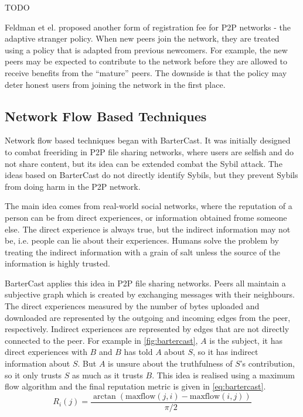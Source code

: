 TODO \cite{resnick2001social}

Feldman et el. proposed another form of registration fee for P2P networks - the
adaptive stranger policy\cite{feldman2004robust}. When new peers join the
network, they are treated using a policy that is adapted from previous
newcomers. For example, the new peers may be expected to contribute to the
network before they are allowed to receive benefits from the ``mature'' peers.
The downside is that the policy may deter honest users from joining the network
in the first place.


\subsection{Network Flow Based Techniques}\label{sec:network-flow}
Network flow based techniques began with
BarterCast\cite{meulpolder2009bartercast}. It was initially designed to combat
freeriding in P2P file sharing networks, where users are selfish and do not
share content, but its idea can be extended combat the Sybil attack. The ideas
based on BarterCast do not directly identify Sybils, but they prevent Sybils
from doing harm in the P2P network.

The main idea comes from real-world social networks, where the reputation of a
person can be from direct experiences, or information obtained frome someone
else. The direct experience is always true, but the indirect information may not
be, i.e. people can lie about their experiences. Humans solve the problem by
treating the indirect information with a grain of salt unless the source of the
information is highly trusted.

BarterCast applies this idea in P2P file sharing networks. Peers all maintain a
subjective graph which is created by exchanging messages with their neighbours.
The direct experiences measured by the number of bytes uploaded and downloaded
are represented by the outgoing and incoming edges from the peer, respectively.
Indirect experiences are represented by edges that are not directly connected to
the peer. For example in \autoref{fig:bartercast}, $A$ is the subject, it has
direct experiences with $B$ and $B$ has told $A$ about $S$, so it has indirect
information about $S$. But $A$ is unsure about the truthfulness of $S$'s
contribution, so it only trusts $S$ as much as it trusts $B$. This idea is
realised using a maximum flow algorithm and the final reputation metric is given
in \autoref{eq:bartercast}.
\begin{equation}\label{eq:bartercast}
  R_i(j) = \frac{\arctan(\text{maxflow}(j, i) - \text{maxflow}(i, j))}{\pi / 2}
\end{equation}

